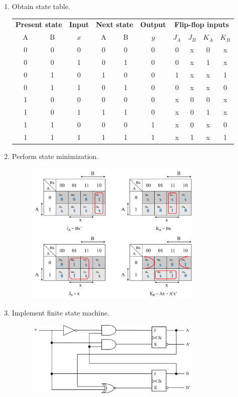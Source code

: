 \documentclass[a4paper]{article}
\begin{document}
\begin{enumerate}[resume]
    \item Obtain state table.
    \begin{table}[H]
    \centering
    \begin{tabular}{ccc|ccc|cccc}
        \multicolumn{2}{c}{\textbf{Present state}} & \textbf{Input} & \multicolumn{2}{c}{\textbf{Next state}} & \textbf{Output} & \multicolumn{4}{c}{\textbf{Flip-flop inputs}} \\
        A & B & $x$ & A & B & $y$ & $J_A$ & $J_B$ & $K_A$ & $K_B$ \\ \hline
        0 & 0 & 0 & 0 & 0 & 0 & 0 & x & 0 & x \\
        0 & 0 & 1 & 0 & 1 & 0 & 0 & x & 1 & x \\
        0 & 1 & 0 & 1 & 0 & 0 & 1 & x & x & 1 \\
        0 & 1 & 1 & 0 & 1 & 0 & 0 & x & x & 0 \\
        1 & 0 & 0 & 0 & 0 & 0 & x & 0 & 0 & x \\
        1 & 0 & 1 & 1 & 1 & 0 & x & 0 & 1 & x \\
        1 & 1 & 0 & 0 & 0 & 1 & x & 0 & x & 0 \\
        1 & 1 & 1 & 1 & 1 & 1 & x & 1 & x & 1
    \end{tabular}
    \end{table}
    \item Perform state minimization.
    \begin{figure}[H]
    \centering
    \includegraphics[width=0.8\textwidth]{state-minimization.png}
    \end{figure}
    \newpage
    \item Implement finite state machine.
    \begin{figure}[H]
    \centering
    \includegraphics[width=0.8\textwidth]{seq-fsm.png}
    \end{figure}
\end{enumerate}
\end{document}
